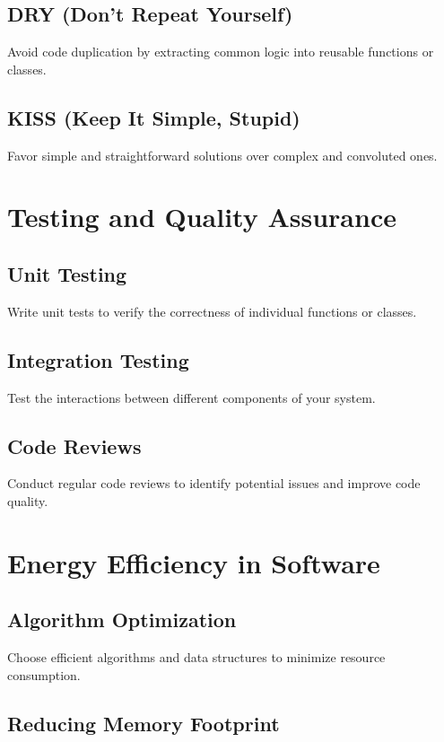\documentclass{book}
\begin{document}
\section{DRY (Don't Repeat Yourself)}

Avoid code duplication by extracting common logic into reusable functions or classes.

\section{KISS (Keep It Simple, Stupid)}

Favor simple and straightforward solutions over complex and convoluted ones.

\chapter{Testing and Quality Assurance}

\section{Unit Testing}

Write unit tests to verify the correctness of individual functions or classes.

\section{Integration Testing}

Test the interactions between different components of your system.

\section{Code Reviews}

Conduct regular code reviews to identify potential issues and improve code quality.

\chapter{Energy Efficiency in Software}

\section{Algorithm Optimization}

Choose efficient algorithms and data structures to minimize resource consumption.

\section{Reducing Memory Footprint}
\end{document}

